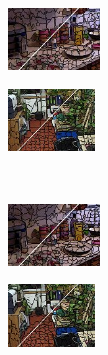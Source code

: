 \begin{figure}
\begin{subfigure}[b]{0.129\textwidth}
	\end{subfigure}
	\begin{subfigure}[b]{0.02\textwidth}
	\end{subfigure}
	\begin{subfigure}[b]{0.1375\textwidth}
		\includegraphics[height=1.65cm]{pictures/nyuv2/cw/cropped/cw_00000561_contours}
	\end{subfigure}
	\begin{subfigure}[b]{0.129\textwidth}
		\includegraphics[height=1.65cm]{pictures/sunrgbd/cw/cropped/cw_00004732_contours}
	\end{subfigure}\\
	\begin{subfigure}[b]{0.02\textwidth}
	\end{subfigure}
	\begin{subfigure}[b]{0.1375\textwidth}
		\includegraphics[height=1.65cm]{pictures/nyuv2/ergc/cropped/ergc_00000561_contours}
	\end{subfigure}
	\begin{subfigure}[b]{0.129\textwidth}
		\includegraphics[height=1.65cm]{pictures/sunrgbd/ergc/cropped/ergc_00004732_contours}
	\end{subfigure}
	\begin{subfigure}[b]{0.02\textwidth}
	\end{subfigure}

\end{figure}
